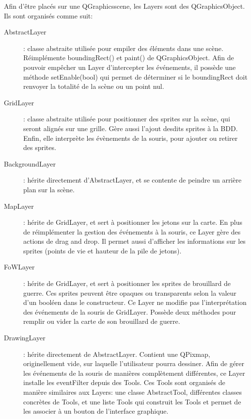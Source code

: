 Afin d'être placés sur une QGraphicsscene, les Layers sont des QGraphicsObject. Ils sont organisés comme suit:
\begin{description}
	\item[AbstractLayer]: classe abstraite utilisée pour empiler des éléments dans une scène. Réimplémente boundingRect() et paint() de QGraphicsObject. Afin de pouvoir empêcher un Layer d'intercepter les événements, il possède une méthode setEnable(bool) qui permet de déterminer si le boundingRect doit renvoyer la totalité de la scène ou un point nul.
	\item[GridLayer]: classe abstraite utilisée pour positionner des sprites sur la scène, qui seront alignés sur une grille. Gère aussi l'ajout desdits sprites à la BDD. Enfin, elle interprète les évènements de la souris, pour ajouter ou retirer des sprites.
	\item[BackgroundLayer]: hérite directement d'AbstractLayer, et se contente de peindre un arrière plan sur la scène.
	\item[MapLayer]: hérite de GridLayer, et sert à positionner les jetons sur la carte. En plus de réimplémenter la gestion des événements à la souris, ce Layer gère des actions de drag and drop. Il  permet aussi d'afficher les informations sur les sprites (points de vie et hauteur de la pile de jetons).
	\item[FoWLayer]: hérite de GridLayer, et sert à positionner les sprites de brouillard de guerre. Ces sprites peuvent être opaques ou transparents selon la valeur d'un booléen dans le constructeur. Ce Layer ne modifie pas l'interprétation des événements de la souris de GridLayer. Possède deux méthodes pour remplir ou vider la carte de son brouillard de guerre. 
	\item[DrawingLayer]: hérite directement de AbstractLayer. Contient une QPixmap, originellement vide, sur laquelle l'utilisateur pourra dessiner. Afin de gérer les événements de la souris de manières complètement différentes, ce Layer installe les eventFilter depuis des Tools. Ces Tools sont organisés de manière similaires aux Layers: une classe AbstractTool, différentes classes concrètes de Tools, et une liste Tools qui construit les Tools et permet de les associer à un bouton de l'interface graphique.
\end{description}
